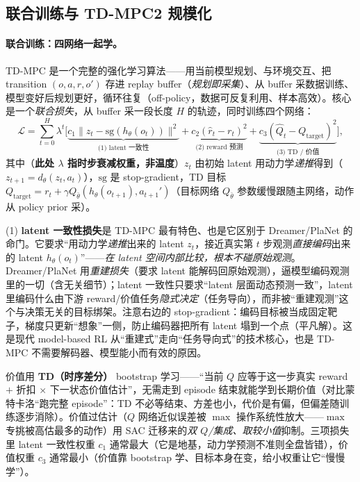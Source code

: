 \subsection{联合训练与 TD-MPC2 规模化}
\label{sec:mv-tdmpc-train}

\paragraph{联合训练：四网络一起学。}
TD-MPC 是一个完整的强化学习算法——用当前模型规划、与环境交互、把 transition $(o,a,r,o')$ 存进 replay buffer（\emph{规划即采集}）、从 buffer 采数据训练、模型变好后规划更好，循环往复（off-policy，数据可反复利用、样本高效）。核心是一个\emph{联合损失}，从 buffer 采一段长度 $H$ 的轨迹，同时训练四个网络\cite{hansen2022tdmpc}：
\begin{equation}
  \mathcal{L}=\sum_{t=0}^{H}\lambda^t\Big[\underbrace{c_1\|z_t-\mathrm{sg}(h_\theta(o_t))\|^2}_{\text{(1) latent 一致性}}+\underbrace{c_2(\hat r_t-r_t)^2}_{\text{(2) reward 预测}}+\underbrace{c_3(\hat Q_t-Q_{\text{target}})^2}_{\text{(3) TD / 价值}}\Big],
  \label{eq:mv-tdmpc-loss}
\end{equation}
其中（\textbf{此处 $\lambda$ 指时步衰减权重，非温度}）$z_t$ 由初始 latent 用动力学\emph{递推}得到（$z_{t+1}=d_\theta(z_t,a_t)$），$\mathrm{sg}$ 是 stop-gradient，TD 目标 $Q_{\text{target}}=r_t+\gamma Q_{\bar\theta}(h_\theta(o_{t+1}),a_{t+1}')$（目标网络 $Q_{\bar\theta}$ 参数缓慢跟随主网络，动作从 policy prior 采）。

\begin{insight}
(1) \textbf{latent 一致性损失}是 TD-MPC 最有特色、也是它区别于 Dreamer/PlaNet 的命门。它要求“用动力学\emph{递推}出来的 latent $z_t$，接近真实第 $t$ 步观测\emph{直接编码}出来的 latent $h_\theta(o_t)$”——\emph{在 latent 空间内部比较，根本不碰原始观测}。Dreamer/PlaNet 用\emph{重建损失}（要求 latent 能解码回原始观测），逼模型编码观测里的一切（含无关细节）；latent 一致性只要求“latent 层面动态预测一致”，latent 里编码什么由下游 reward/价值任务\emph{隐式决定}（任务导向），而非被“重建观测”这个与决策无关的目标绑架。注意右边的 stop-gradient：编码目标被当成固定靶子，梯度只更新“想象”一侧，防止编码器把所有 latent 塌到一个点（平凡解）。这是现代 model-based RL 从“重建式”走向“任务导向式”的技术核心，也是 TD-MPC 不需要解码器、模型能小而有效的原因。
\end{insight}

\noindent 价值用 \textbf{TD（时序差分）} bootstrap 学习——“当前 $Q$ 应等于这一步真实 reward $+$ 折扣 $\times$ 下一状态价值估计”，无需走到 episode 结束就能学到长期价值（对比蒙特卡洛“跑完整 episode”：TD 不必等结束、方差也小，代价是有偏，但偏差随训练逐步消除）。价值过估计（$Q$ 网络近似误差被 $\max$ 操作系统性放大——$\max$ 专挑被高估最多的动作）用 SAC 迁移来的\emph{双 $Q$/集成、取较小值}抑制。三项损失里 latent 一致性权重 $c_1$ 通常最大（它是地基，动力学预测不准则全盘皆错），价值权重 $c_3$ 通常最小（价值靠 bootstrap 学、目标本身在变，给小权重让它“慢慢学”）。


